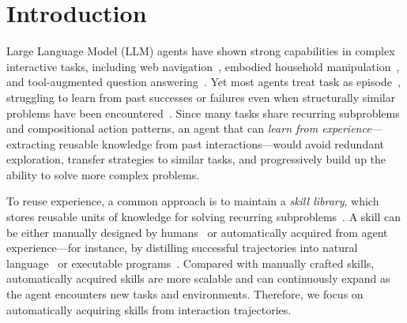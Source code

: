 \section{Introduction}
\label{sec:introduction}

Large Language Model (LLM) agents have shown strong capabilities in complex interactive tasks, including web navigation~\citep{yao2022webshop}, embodied household manipulation~\citep{shridhar2020alfworld}, and tool-augmented question answering~\citep{yao2022react}. 
Yet most agents treat task as episode~\citep{yao2022react, shinn2023reflexion}, struggling to learn from past successes or failures even when structurally similar problems have been encountered~\citep{xia2025skillrl}.
Since many tasks share recurring subproblems and compositional action patterns, an agent that can \emph{learn from experience}---extracting reusable knowledge from past interactions---would avoid redundant exploration, transfer strategies to similar tasks, and progressively build up the ability to solve more complex problems.

To reuse experience, a common approach is to maintain a \emph{skill library}, which stores reusable units of knowledge for solving recurring subproblems~\citep{wang2023voyager, zhao2024expel, xia2025skillrl}. 
A skill can be either manually designed by humans~\citep{xu2026agent} or automatically acquired from agent experience---for instance, by distilling successful trajectories into natural language~\citep{zhao2024expel, xia2025skillrl} or executable programs~\citep{wang2023voyager}. 
Compared with manually crafted skills, automatically acquired skills are more scalable and can continuously expand as the agent encounters new tasks and environments. 
Therefore, we focus on automatically acquiring skills from interaction trajectories.

